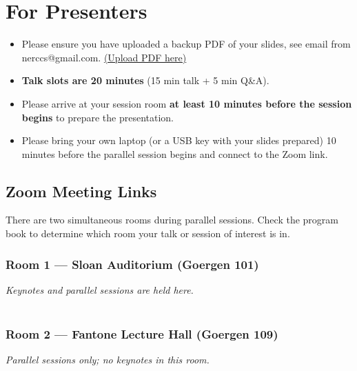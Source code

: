 \documentclass[11pt]{article}
\begin{document}
\section{For Presenters}

\begin{itemize}
	\item Please ensure you have uploaded a backup PDF of your slides, see email 
	from nerccs@gmail.com. \href{https://forms.gle/S6GBNdRkcAE43YWo7}{(Upload PDF 
	here)}
    \item \textbf{Talk slots are 20 minutes} (15 min talk + 5 min Q\&A).
    \item Please arrive at your session room \textbf{at least 10 minutes before the 
    session begins} to prepare the presentation.
    \item Please bring your own laptop (or a USB key with your slides prepared) 10 
    minutes before the parallel session begins and connect to the Zoom link.

\end{itemize}

\subsection{Zoom Meeting Links}

There are two simultaneous rooms during parallel sessions.
Check the program book to determine which room your talk or session of interest is 
in.

\subsubsection*{Room 1 — Sloan Auditorium (Goergen 101)}
\textit{Keynotes and parallel sessions are held here.}\\[0.5em]
\\

\subsubsection*{Room 2 — Fantone Lecture Hall (Goergen 109)}
\textit{Parallel sessions only; no keynotes in this room.}\\[0.5em]
\\
\end{document}
